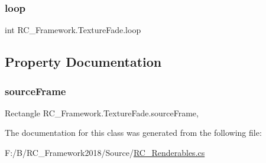 \subsubsection{\texorpdfstring{loop}{loop}}
{\footnotesize\ttfamily int R\+C\+\_\+\+Framework.\+Texture\+Fade.\+loop}



\subsection{Property Documentation}
\mbox{\label{class_r_c___framework_1_1_texture_fade_ae8f66abd6538dadde56f9c91d67830a4}} 
\subsubsection{\texorpdfstring{source\+Frame}{sourceFrame}}
{\footnotesize\ttfamily Rectangle R\+C\+\_\+\+Framework.\+Texture\+Fade.\+source\+Frame\hspace{0.3cm}{\ttfamily [get]}, {\ttfamily [set]}}



The documentation for this class was generated from the following file\+:\begin{DoxyCompactItemize}
\item 
F\+:/\+B/\+R\+C\+\_\+\+Framework2018/\+Source/\mbox{\hyperlink{_r_c___renderables_8cs}{R\+C\+\_\+\+Renderables.\+cs}}\end{DoxyCompactItemize}
